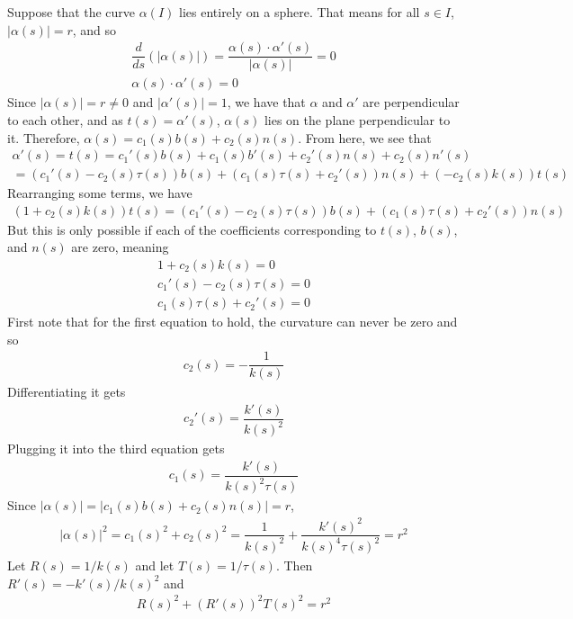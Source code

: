 \documentclass{article}
\begin{document}
	Suppose that the curve $\alpha(I)$ lies entirely on a sphere. That means for all $s \in I$, $|\alpha(s)| = r$, and so
	\begin{gather*}
		\dfrac{d}{ds} \left( |\alpha(s)| \right) = \dfrac{\alpha(s) \cdot \alpha'(s)}{|\alpha(s)|} = 0 \\
		\alpha(s) \cdot \alpha'(s) = 0
	\end{gather*}
	Since $|\alpha(s)| = r \neq 0$ and $|\alpha'(s)| = 1$, we have that $\alpha$ and $\alpha'$ are perpendicular to each other, and as $t(s) = \alpha'(s)$, $\alpha(s)$ lies on the plane perpendicular to it. Therefore, $\alpha(s) = c_1(s) b(s) + c_2(s) n(s)$. From here, we see that
	\begin{gather*}
		\alpha'(s) = t(s) = c_1'(s) b(s) + c_1(s) b'(s) + c_2'(s) n(s) + c_2(s) n'(s) \\
		= \left( c_1'(s) - c_2(s) \tau(s) \right) b(s) + \left( c_1(s) \tau(s) + c_2'(s) \right) n(s) + \left( -c_2(s) k(s) \right) t(s)
	\end{gather*}
	Rearranging some terms, we have
	\begin{gather*}
		\left( 1 + c_2(s) k(s) \right) t(s) = \left( c_1'(s) - c_2(s) \tau(s) \right) b(s) + \left( c_1(s) \tau(s) + c_2'(s) \right) n(s)
	\end{gather*}
	But this is only possible if each of the coefficients corresponding to $t(s)$, $b(s)$, and $n(s)$ are zero, meaning
	\begin{gather*}
		1 + c_2(s) k(s) = 0 \\
		c_1'(s) - c_2(s) \tau(s) = 0 \\
		c_1(s) \tau(s) + c_2'(s) = 0
	\end{gather*}
	First note that for the first equation to hold, the curvature can never be zero and so
	\begin{gather*}
		c_2(s) = -\dfrac{1}{k(s)}
	\end{gather*}
	Differentiating it gets
	\begin{gather*}
		c_2'(s) = \dfrac{k'(s)}{k(s)^2}
	\end{gather*}
	Plugging it into the third equation gets
	\begin{gather*}
		c_1(s) = \dfrac{k'(s)}{k(s)^2 \tau(s)}
	\end{gather*}
	Since $|\alpha(s)| = |c_1(s)b(s) + c_2(s)n(s)| = r$,
	\begin{gather*}
		|\alpha(s)|^2 = c_1(s)^2 + c_2(s)^2 = \dfrac{1}{k(s)^2} + \dfrac{k'(s)^2}{k(s)^4 \tau(s)^2} = r^2		
	\end{gather*}
	Let $R(s) = 1/k(s)$ and let $T(s) = 1/\tau(s)$. Then $R'(s) = -k'(s)/k(s)^2$ and
	\begin{gather*}
		R(s)^2 + (R'(s))^2 T(s)^2 = r^2
	\end{gather*}
	
\end{document}
